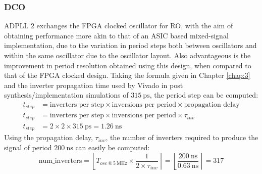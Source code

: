 \subsubsection{\acl{DCO}}
\ac{ADPLL} 2 exchanges the \ac{FPGA} clocked oscillator for \ac{RO}, with the aim of obtaining performance more akin to that of an \ac{ASIC} based mixed-signal implementation, due to the variation in period steps both between oscillators and within the same oscillator due to the oscillator layout. Also advantageous is the improvement in period resolution obtained using this design, when compared to that of the \ac{FPGA} clocked design. Taking the formula given in Chapter \ref{chap:3} and the inverter propagation time used by Vivado in post synthesis/implementation simulations of $315~\si{\pico\second}$, the period step can be computed:
\begin{align}
t_{step} &= \text{inverters per step}\times\text{inversions per period}\times\text{propagation delay} \\
t_{step} &= \text{inverters per step}\times\text{inversions per period}\times\tau_{inv} \\
t_{step} &= 2\times 2\times 315~\si{\pico\second} = 1.26~\si{\nano\second}
\end{align}
Using the propagation delay, $\tau_{inv}$, the number of inverters required to produce the signal of period $200~\si{\nano\second}$ can easily be computed:
\begin{equation}
\text{num\_inverters} = \left \lfloor{ T_{osc~@~5~\si{\mega\hertz}}\times \frac{1}{2\times\tau_{inv}}}\right \rceil = \left \lfloor{ \frac{200~\si{\nano\second}}{0.63~\si{\nano\second}}}\right \rceil = 317
\end{equation}

